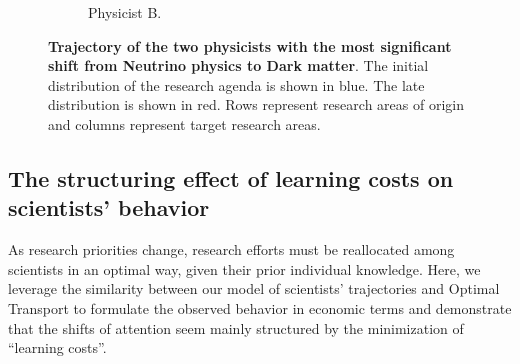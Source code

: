 \documentclass{article}
\begin{document}
\begin{figure}[h]
\begin{subfigure}{0.45\textwidth}
    \caption{Physicist B. %
    }
    \label{fig:J.F.Beacom.1}
\end{subfigure}
\caption{\textbf{Trajectory of the two physicists with the most significant shift from Neutrino physics to Dark matter}. The initial distribution of the research agenda is shown in blue. The late distribution is shown in red. Rows represent research areas of origin and columns represent target research areas.}
\label{fig:turns_neutrinos_dm}
\end{figure}

\subsection{\label{sec:optimal-transport}The structuring effect of learning costs on scientists' behavior}

As research priorities change, research efforts must be reallocated among scientists in an optimal way, given their prior individual knowledge. Here, we leverage the similarity between our model of scientists' trajectories and Optimal Transport \citep{muzellec2017tsallis,li2019learning} to formulate the observed behavior in economic terms and demonstrate that the shifts of attention seem mainly structured by the minimization of ``learning costs''. 
\end{document}
